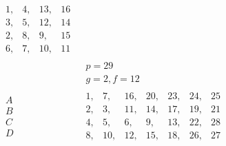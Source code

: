 \documentclass[twoside,12pt]{memoir}
\begin{document}
\[\begin{aligned}
\begin{array}{|rrrr} 
1,& 4,&13,& 16 \\ 
3,& 5,&12,&14 \\
2,& 8,& 9,&15 \\ 
6,& 7,&10,&11 
\end{array} \\
& \begin{array}{c} p=29 \\  g=2, f=12 \end{array} \\
\begin{array}{l} A \\ B \\ C \\D \end{array} & 
\begin{array}{|rrrrrrr} 1,&7,&16,&20,&23,&24,&25\\ 
2,& 3,&11,&14,&17,&19,&21 \\ 
4,& 5,&6,&9,&13,&22,&28 \\ 
8,& 10,& 12,&15,&18,& 26,&27
\end{array} \\
\end{aligned}\]\pagebreak%
\end{document}
